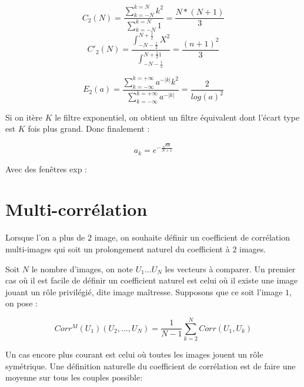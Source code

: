 \begin{equation}
    C_2(N) = \frac{\sum_{k=-N}^{k=N} k^2}{\sum_{k=-N}^{k=N}1} = \frac{N*(N+1)}{3}
\end{equation}
\begin{equation}
    C'_2(N)  
      = \frac{\int_{-N-\frac{1}{2}}^{N+\frac{1}{2}} X^2}{\int_{-N-\frac{1}{2}}^{N+\frac{1}{2} 1}}
      = \frac{(n+1)^2} {3}
\end{equation}

\begin{equation}
    E_2(a) 
       = \frac{\sum_{k=-\infty}^{k=+\infty} a^{-|k|}k^2}{\sum_{k=-\infty}^{k=+\infty} a^{-|k|}}
       = \frac{2}{log(a)^2}
\end{equation}

Si on it\`ere $K$ le filtre exponentiel, on obtient un filtre \'equivalent dont l'\'ecart
type est $K$ fois plus grand.  Donc finalement :



\begin{equation}
   a_k = e^{-\frac{\sqrt{6k}}{N+1}}
\end{equation}


Avec des fen\^etres exp :



\section{Multi-corr\'elation}


\label{MecaGen:Multi:Correl}
Lorsque l'on a plus de $2$ image, on souhaite d\'efinir un coefficient
de corr\'elation multi-images qui soit un prolongement naturel du 
coefficient \`a $2$ images.

Soit $N$ le nombre d'images, on note $U_1\dots U_N$ les vecteurs
\`a comparer. Un premier cas o\`u il est facile de d\'efinir
un coefficient  naturel est celui o\`u il existe une image  jouant
un r\^ole privil\'egi\'e, dite image ma\^itresse. Supposons
que ce soit l'image $1$, on pose :

\begin{equation}
   Corr^M(U_1)(U_2,\dots,U_N) =  
    \frac{1}{N-1} \sum_{k=2}^N Corr(U_1,U_k)
   \label{Cor:Im:Maitre}
\end{equation}

Un cas encore plus courant est celui o\`u toutes les images jouent
un r\^ole sym\'etrique. Une d\'efinition naturelle du coefficient de
corr\'elation est de faire une moyenne sur tous les couples possible:

